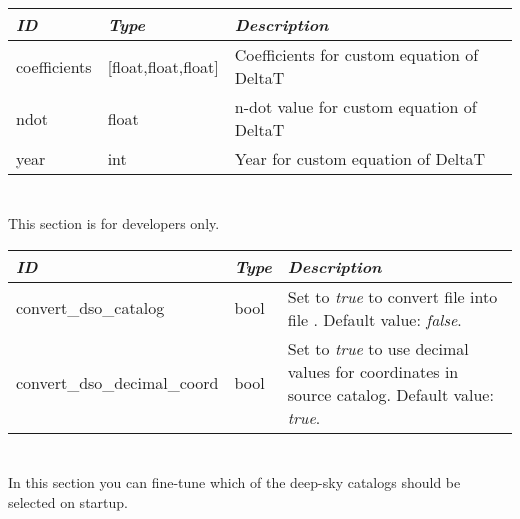\begin{longtabu} to \textwidth {l|l|X}\toprule
\emph{ID}    & \emph{Type} & \emph{Description}\\\midrule
coefficients & [float,float,float] & Coefficients for custom equation of DeltaT\\\midrule
ndot & float & n-dot value for custom equation of DeltaT\\\midrule
year & int   & Year for custom equation of DeltaT\\\bottomrule
\end{longtabu}

\section{}
\label{sec:config.ini:devel}

This section is for developers only. 

\begin{longtabu} to \textwidth {l|l|X}\toprule
\emph{ID}              & \emph{Type} & \emph{Description}\\\midrule
convert\_dso\_catalog        & bool & Set to \emph{true} to convert file  
                                      into file . Default value: \emph{false}.\\\midrule
convert\_dso\_decimal\_coord & bool & Set to \emph{true} to use decimal values for coordinates 
                                      in source catalog. Default value: \emph{true}.\\\bottomrule
\end{longtabu}

\section{}
\label{sec:config.ini:dso_catalog_filters}
In this section you can fine-tune which of the deep-sky catalogs should be selected on startup.

